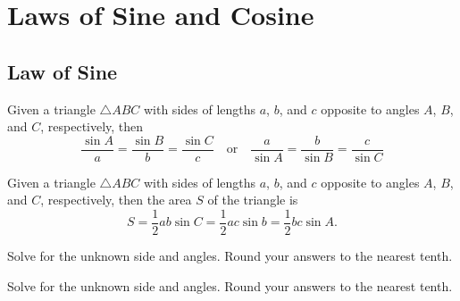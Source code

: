 
\chapter{Laws of Sine and Cosine}

\section{Law of Sine}
\begin{theorem}
  Given a triangle $\triangle ABC$ with sides of lengths $a$, $b$, and $c$ opposite to angles $A$, $B$, and $C$, respectively, then
\[\dfrac{\sin A}{a}=\dfrac{\sin B}{b}=\dfrac{\sin C}{c}
\quad\text{or}\quad
\dfrac{a}{\sin A}=\dfrac{b}{\sin B}=\dfrac{c}{\sin C}\]
\end{theorem}

\begin{corollary}
  Given a triangle $\triangle ABC$ with sides of lengths $a$, $b$, and $c$ opposite to angles $A$, $B$, and $C$, respectively, then the area $S$ of the triangle is
  \[S=\frac{1}{2}ab\sin C=\frac{1}{2}ac\sin b=\frac{1}{2}bc\sin A.\]
\end{corollary}

\begin{example}
  Solve for the unknown side and angles. Round your answers to the nearest tenth.\\
\end{example}

\begin{example}
  Solve for the unknown side and angles. Round your answers to the nearest tenth.\\
\end{example}


